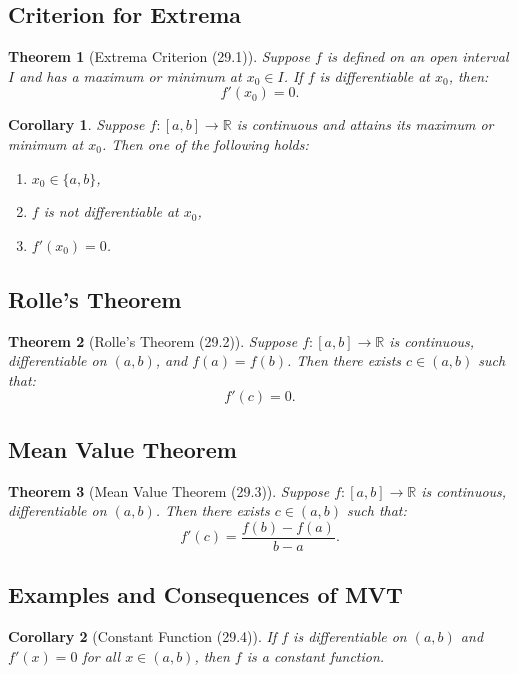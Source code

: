 \documentclass[9pt]{article}
\theoremstyle{definition}
\theoremstyle{plain}
\newtheorem{theorem}{Theorem}
\newtheorem{corollary}{Corollary}
\begin{document}
\subsection*{Criterion for Extrema}
\begin{theorem}[Extrema Criterion (29.1)]
Suppose \( f \) is defined on an open interval \( I \) and has a maximum or minimum at \( x_0 \in I \). If \( f \) is differentiable at \( x_0 \), then:
\[
f'(x_0) = 0.
\]
\end{theorem}

\begin{corollary}
Suppose \( f : [a, b] \to \mathbb{R} \) is continuous and attains its maximum or minimum at \( x_0 \). Then one of the following holds:
\begin{enumerate}
    \item \( x_0 \in \{a, b\} \),
    \item \( f \) is not differentiable at \( x_0 \),
    \item \( f'(x_0) = 0 \).
\end{enumerate}
\end{corollary}

\subsection*{Rolle’s Theorem}
\begin{theorem}[Rolle’s Theorem (29.2)]
Suppose \( f : [a, b] \to \mathbb{R} \) is continuous, differentiable on \( (a, b) \), and \( f(a) = f(b) \). Then there exists \( c \in (a, b) \) such that:
\[
f'(c) = 0.
\]
\end{theorem}

\subsection*{Mean Value Theorem}
\begin{theorem}[Mean Value Theorem (29.3)]
Suppose \( f : [a, b] \to \mathbb{R} \) is continuous, differentiable on \( (a, b) \). Then there exists \( c \in (a, b) \) such that:
\[
f'(c) = \frac{f(b) - f(a)}{b - a}.
\]
\end{theorem}

\subsection*{Examples and Consequences of MVT}
\begin{corollary}[Constant Function (29.4)]
If \( f \) is differentiable on \( (a, b) \) and \( f'(x) = 0 \) for all \( x \in (a, b) \), then \( f \) is a constant function.
\end{corollary}
\end{document}
